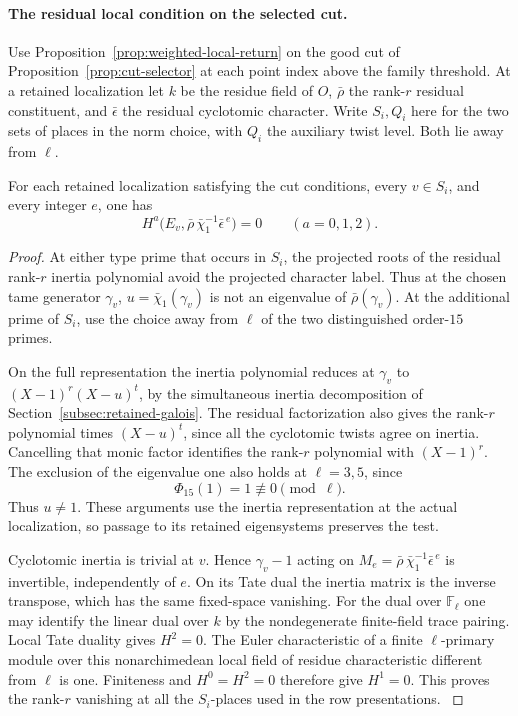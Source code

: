 \paragraph{The residual local condition on the selected cut.}
Use Proposition~\ref{prop:weighted-local-return} on the good cut
of Proposition~\ref{prop:cut-selector} at each
point index above the family threshold. At a retained localization
let \(k\) be the residue field of \(O\), \(\bar\rho\) the
rank-\(r\) residual constituent, and \(\bar\epsilon\) the
residual cyclotomic character. Write \(S_i,Q_i\) here for the two
sets of places in the norm choice, with \(Q_i\) the auxiliary
twist level. Both lie away from \(\ell\).
\begin{lemma}\label{lem:cut-residual-vanishing}
For each retained localization satisfying the cut conditions, every
\(v\in S_i\), and every integer \(e\), one has
\[
 H^a\big(E_v,\bar\rho\,\bar\chi_1^{-1}\bar\epsilon^{\,e}\big)=0
                       \qquad (a=0,1,2).
\]
\end{lemma}

\begin{proof}
At either type prime that occurs in \(S_i\), the projected
roots of the residual rank-\(r\) inertia polynomial avoid the
projected character label. Thus at the chosen tame generator
\(\gamma_v\), \(u=\bar\chi_1(\gamma_v)\) is not an eigenvalue
of \(\bar\rho(\gamma_v)\).
At the additional prime of \(S_i\), use the choice away from
\(\ell\) of the two distinguished order-\(15\) primes.

On the
full representation the inertia polynomial reduces at \(\gamma_v\)
to \((X-1)^r(X-u)^t\), by the simultaneous inertia decomposition
of Section~\ref{subsec:retained-galois}. The residual factorization
also gives the rank-\(r\) polynomial times \((X-u)^t\), since all
the cyclotomic twists agree on inertia. Cancelling that monic
factor identifies the rank-\(r\) polynomial with \((X-1)^r\).
The exclusion of the eigenvalue one also holds at \(\ell=3,5\), since
\[
 \Phi_{15}(1)=1\not\equiv0\pmod\ell.
\]
Thus \(u\ne1\). These arguments use the inertia representation at
the actual localization, so passage to its retained eigensystems
preserves the test.

Cyclotomic inertia is trivial at \(v\). Hence \(\gamma_v-1\)
acting on \(M_e=\bar\rho\,\bar\chi_1^{-1}\bar\epsilon^{\,e}\)
is invertible, independently of \(e\). On its Tate dual the
inertia matrix is the inverse transpose, which has the same
fixed-space vanishing. For the dual over \(\mathbb F_\ell\)
one may identify the linear dual over \(k\) by the nondegenerate
finite-field trace pairing. Local Tate duality gives \(H^2=0\).
The Euler characteristic of a finite \(\ell\)-primary module
over this nonarchimedean local field of residue characteristic
different from \(\ell\) is one. Finiteness and \(H^0=H^2=0\)
therefore give \(H^1=0\). This proves the rank-\(r\) vanishing
at all the \(S_i\)-places used in the row presentations.
\cite{milne-duality}\label{cor:division-length-1}
\end{proof}


